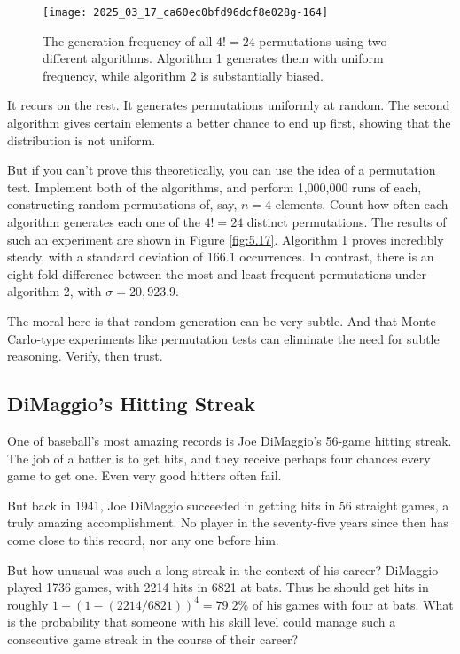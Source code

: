 \documentclass[10pt]{article}
\begin{document}
\begin{figure}[H]
\centering
\texttt{[image: 2025\_03\_17\_ca60ec0bfd96dcf8e028g-164]}
\caption{The generation frequency of all $4!=24$ permutations using two different algorithms. Algorithm 1 generates them with uniform frequency, while algorithm 2 is substantially biased.}
\end{figure}

It recurs on the rest. It generates permutations uniformly at random. The second algorithm gives certain elements a better chance to end up first, showing that the distribution is not uniform.

But if you can't prove this theoretically, you can use the idea of a permutation test. Implement both of the algorithms, and perform 1,000,000 runs of each, constructing random permutations of, say, $n=4$ elements. Count how often each algorithm generates each one of the $4!=24$ distinct permutations. The results of such an experiment are shown in Figure \ref{fig:5.17}. Algorithm 1 proves incredibly steady, with a standard deviation of 166.1 occurrences. In contrast, there is an eight-fold difference between the most and least frequent permutations under algorithm 2, with $\sigma = 20,923.9$.

The moral here is that random generation can be very subtle. And that Monte Carlo-type experiments like permutation tests can eliminate the need for subtle reasoning. Verify, then trust.

\subsection{DiMaggio's Hitting Streak}
One of baseball's most amazing records is Joe DiMaggio's 56-game hitting streak. The job of a batter is to get hits, and they receive perhaps four chances every game to get one. Even very good hitters often fail.

But back in 1941, Joe DiMaggio succeeded in getting hits in 56 straight games, a truly amazing accomplishment. No player in the seventy-five years since then has come close to this record, nor any one before him.

But how unusual was such a long streak in the context of his career? DiMaggio played 1736 games, with 2214 hits in 6821 at bats. Thus he should get hits in roughly $1 - (1 - (2214 / 6821))^{4} = 79.2\%$ of his games with four at bats. What is the probability that someone with his skill level could manage such a consecutive game streak in the course of their career?
\end{document}
